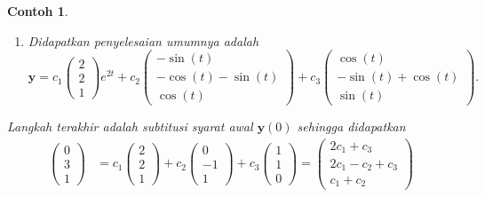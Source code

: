 \documentclass[a4paper]{article}
\theoremstyle{definisi}
\newtheorem{contoh}{Contoh}[section]
\numberwithin{equation}{section}
\begin{document}
\begin{contoh}
\begin{enumerate}[label=Langkah \arabic*: ,leftmargin=*]
\begin{align*}
      \end{align*}
      dan
      \begin{align*}
        \mathbf{y}_3(t) &= e^{0t}\left(\begin{pmatrix}0\\-1\\1\end{pmatrix}\sin(t) + \begin{pmatrix}1\\1\\0\end{pmatrix}\cos(t)\right)=\begin{pmatrix}\cos(t)\\-\sin(t)+\cos(t)\\\sin(t)\end{pmatrix}
      \end{align*}
      \item Didapatkan penyelesaian umumnya adalah
      \[\mathbf{y}=c_1\begin{pmatrix}2\\2\\1\end{pmatrix}e^{2t} + c_2\begin{pmatrix}-\sin(t)\\-\cos(t)-\sin(t)\\\cos(t)\end{pmatrix} + c_3\begin{pmatrix}\cos(t)\\-\sin(t)+\cos(t)\\\sin(t)\end{pmatrix}.\]
    \end{enumerate}
    Langkah terakhir adalah subtitusi syarat awal $\mathbf{y}(0)$ sehingga didapatkan
    \begin{align*}
      \begin{pmatrix}0\\3\\1\end{pmatrix} &= c_1\begin{pmatrix}2\\2\\1\end{pmatrix} + c_2\begin{pmatrix}0\\-1\\1\end{pmatrix} + c_3\begin{pmatrix}1\\1\\0\end{pmatrix}= \begin{pmatrix}2c_1+c_3\\2c_1-c_2+c_3\\c_1+c_2\end{pmatrix}

\end{align*}
\end{contoh}
\end{document}

